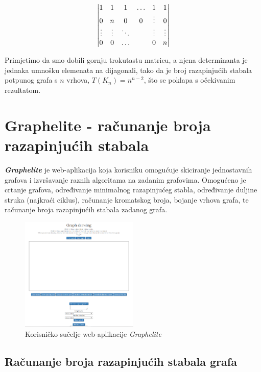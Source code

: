 \documentclass[times, utf8, zavrsni]{fer}
\begin{document}
 \[
\centering
\left|
\begin{matrix}
	1 & 1 & 1 & \ldots & 1 & 1 \\
	0 & n & 0 & 0 & \vdots & 0 \\
	\vdots & \vdots & \ddots & & \vdots & \vdots  \\
	0 & 0 & \ldots & & 0 & n
\end{matrix}
\right|
\]

Primjetimo da smo dobili gornju trokutastu matricu, a njena determinanta je jednaka umnošku elemenata na dijagonali, tako da je broj razapinjućih stabala potpunog grafa s $n$ vrhova, $T(K_n) = n^{n-2}$, što se poklapa s očekivanim rezultatom.

\chapter{Graphelite - računanje broja razapinjućih stabala}

\textit{\textbf{Graphelite}} je web-aplikacija koja korisniku omogućuje skiciranje jednostavnih grafova i izvršavanje raznih algoritama na zadanim grafovima. Omogućeno je crtanje grafova, određivanje minimalnog razapinjućeg stabla, određivanje duljine struka (najkraći ciklus), računanje kromatskog broja, bojanje vrhova grafa, te računanje broja razapinjućih stabala zadanog grafa.

\begin{figure}[htb]
	\centering
	\includegraphics[width=0.5\textwidth]{slike/graphelite.png}
	\caption{Korisničko sučelje web-aplikacije \textit{Graphelite}}
	\label{fig:graphelite}
\end{figure}

\section{Računanje broja razapinjućih stabala grafa}
\end{document}
